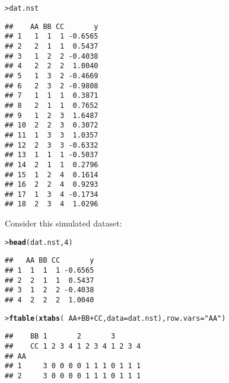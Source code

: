 \documentclass[11pt]{article}\usepackage[]{graphicx}\usepackage[]{color}
\makeatletter
\newcommand{\hlnum}[1]{\textcolor[rgb]{0.686,0.059,0.569}{#1}}%
\newcommand{\hlstr}[1]{\textcolor[rgb]{0.192,0.494,0.8}{#1}}%
\newcommand{\hlopt}[1]{\textcolor[rgb]{0,0,0}{#1}}%
\newcommand{\hlstd}[1]{\textcolor[rgb]{0.345,0.345,0.345}{#1}}%
\newcommand{\hlkwc}[1]{\textcolor[rgb]{0.333,0.667,0.333}{#1}}%
\newcommand{\hlkwd}[1]{\textcolor[rgb]{0.737,0.353,0.396}{\textbf{#1}}}%
\newenvironment{kframe}{%
 \def\at@end@of@kframe{}%
 \ifinner\ifhmode%
  \def\at@end@of@kframe{\end{minipage}}%
  \begin{minipage}{\columnwidth}%
 \fi\fi%
 \def\FrameCommand##1{\hskip\@totalleftmargin \hskip-\fboxsep
 \colorbox{shadecolor}{##1}\hskip-\fboxsep
     \hskip-\linewidth \hskip-\@totalleftmargin \hskip\columnwidth}%
 \MakeFramed {\advance\hsize-\width
   \@totalleftmargin\z@ \linewidth\hsize
   \@setminipage}}%
 {\par\unskip\endMakeFramed%
 \at@end@of@kframe}
\newenvironment{knitrout}{}{} %
\renewenvironment{knitrout}{
  \begin{oldknitrout}
    \footnotesize
    \topsep=0pt
}{
  \end{oldknitrout}
}
\makeatother
\begin{document}
\begin{knitrout}
\color{fgcolor}\begin{kframe}
\begin{alltt}
\hlstd{> }\hlstd{dat.nst}
\end{alltt}
\begin{verbatim}
##    AA BB CC       y
## 1   1  1  1 -0.6565
## 2   2  1  1  0.5437
## 3   1  2  2 -0.4038
## 4   2  2  2  1.0040
## 5   1  3  2 -0.4669
## 6   2  3  2 -0.9808
## 7   1  1  1  0.3871
## 8   2  1  1  0.7652
## 9   1  2  3  1.6487
## 10  2  2  3  0.3072
## 11  1  3  3  1.0357
## 12  2  3  3 -0.6332
## 13  1  1  1 -0.5037
## 14  2  1  1  0.2796
## 15  1  2  4  0.1614
## 16  2  2  4  0.9293
## 17  1  3  4 -0.1734
## 18  2  3  4  1.0296
\end{verbatim}
\end{kframe}
\end{knitrout}

Consider this simulated dataset:
\begin{knitrout}
\color{fgcolor}\begin{kframe}
\begin{alltt}
\hlstd{> }\hlkwd{head}\hlstd{(dat.nst,} \hlnum{4}\hlstd{)}
\end{alltt}
\begin{verbatim}
##   AA BB CC       y
## 1  1  1  1 -0.6565
## 2  2  1  1  0.5437
## 3  1  2  2 -0.4038
## 4  2  2  2  1.0040
\end{verbatim}
\begin{alltt}
\hlstd{> }\hlkwd{ftable}\hlstd{(}\hlkwd{xtabs}\hlstd{(} \hlopt{~} \hlstd{AA} \hlopt{+} \hlstd{BB} \hlopt{+} \hlstd{CC,} \hlkwc{data}\hlstd{=dat.nst),} \hlkwc{row.vars}\hlstd{=}\hlstr{"AA"}\hlstd{)}
\end{alltt}
\begin{verbatim}
##    BB 1       2       3      
##    CC 1 2 3 4 1 2 3 4 1 2 3 4
## AA                           
## 1     3 0 0 0 0 1 1 1 0 1 1 1
## 2     3 0 0 0 0 1 1 1 0 1 1 1
\end{verbatim}
\end{kframe}
\end{knitrout}
\end{document}
